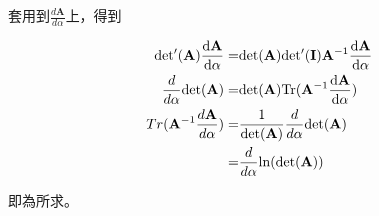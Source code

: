 \documentclass{article}
\begin{document}
套用到$\frac{d\mathbf A}{d\alpha}$上，得到

\begin{equation}
\begin{aligned}
\rm det'(\mathbf A)\frac{d\mathbf A}{d\alpha}=& \rm det(\mathbf A)\rm det'(\mathbf I)\mathbf A^{-1}\frac{d\mathbf A}{d\alpha}\\
\frac{d}{d\alpha}\rm det(\mathbf A)=& \rm det(\mathbf A)\rm Tr(\mathbf A^{-1}\frac{d\mathbf A}{d\alpha})\\
Tr(\mathbf A^{-1}\frac{d\mathbf A}{d\alpha})=&\frac{1}{\rm det(\mathbf A)}\frac{d}{d\alpha}\rm det(\mathbf A)\\
=& \frac{d}{d\alpha}\rm ln(\rm det(\mathbf A))
\end{aligned}
\end{equation}

即為所求。
\end{document}
